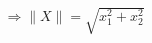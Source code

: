 \documentclass[preview]{standalone}
\begin{document}
\begin{align*}
\Rightarrow \lVert X \rVert = \sqrt{ x_{1}^{2}+x_{2}^{2} }
\end{align*}
\end{document}
